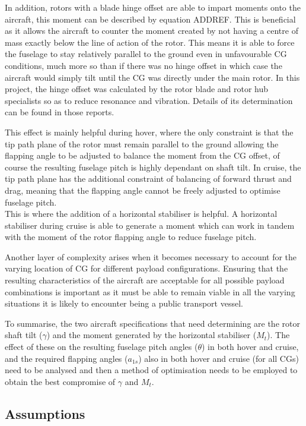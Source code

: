 \documentclass[11pt,a4paper]{article}
\begin{document}
In addition, rotors with a blade hinge offset are able to impart moments onto the aircraft, this moment can be described by equation ADDREF. This is beneficial as it allows the aircraft to counter the moment created by not having a centre of mass exactly below the line of action of the rotor. This means it is able to force the fuselage to stay relatively parallel to the ground even in unfavourable CG conditions, much more so than if there was no hinge offset in which case the aircraft would simply tilt until the CG was directly under the main rotor. In this project, the hinge offset was calculated by the rotor blade and rotor hub specialists so as to reduce resonance and vibration. Details of its determination can be found in those reports.

This effect is mainly helpful during hover, where the only constraint is that the tip path plane of the rotor must remain parallel to the ground allowing the flapping angle to be adjusted to balance the moment from the CG offset, of course the resulting fuselage pitch is highly dependant on shaft tilt. In cruise, the tip path plane has the additional constraint of balancing of forward thrust and drag, meaning that the flapping angle cannot be freely adjusted to optimise fuselage pitch. \\
This is where the addition of a horizontal stabiliser is helpful. A horizontal stabiliser during cruise is able to generate a moment which can work in tandem with the moment of the rotor flapping angle to reduce fuselage pitch.

Another layer of complexity arises when it becomes necessary to account for the varying location of CG for different payload configurations. Ensuring that the resulting characteristics of the aircraft are acceptable for all possible payload combinations is important as it must be able to remain viable in all the varying situations it is likely to encounter being a public transport vessel.

To summarise, the two aircraft specifications that need determining are the rotor shaft tilt ($\gamma$) and the moment generated by the horizontal stabiliser ($M_t$). The effect of these on the resulting fuselage pitch angles ($\theta$) in both hover and cruise, and the required flapping angles ($a_{1s}$) also in both hover and cruise (for all CGs) need to be analysed and then a method of optimisation needs to be employed to obtain the best compromise of $\gamma$ and $M_t$.

\subsection{Assumptions}
\end{document}
